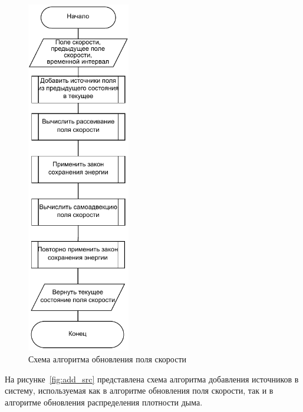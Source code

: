 \begin{figure}[H]
	\centering
	\includegraphics[width=0.4\textwidth, page=1]{assets/img/velocity_step.pdf}   
	\caption{Схема алгоритма обновления поля скорости}
	\label{fig:vel_step}
\end{figure}

На рисунке~\ref{fig:add_src} представлена схема алгоритма добавления источников в систему, используемая как в алгоритме обновления поля скорости, так и в алгоритме обновления распределения плотности дыма.


